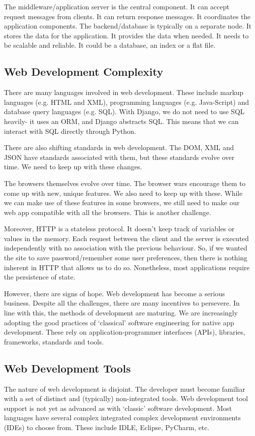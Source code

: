 \documentclass[a4paper, openany]{memoir}
\begin{document}
    The middleware/application server is the central component. It can accept request messages from clients. It can return response messages. It coordinates the application components. The backend/database is typically on a separate node. It stores the data for the application. It provides the data when needed. It needs to be scalable and reliable. It could be a database, an index or a flat file.

    \subsection{Web Development Complexity}
    There are many languages involved in web development. These include markup languages (e.g. HTML and XML), programming languages (e.g. Java-Script) and database query languages (e.g. SQL). With Django, we do not need to use SQL heavily- it uses an ORM, and Django abstracts SQL. This means that we can interact with SQL directly through Python.

    There are also shifting standards in web development. The DOM, XML and JSON have standards associated with them, but these standards evolve over time. We need to keep up with these changes.

    The browsers themselves evolve over time. The browser wars encourage them to come up with new, unique features. We also need to keep up with these. While we can make use of these features in some browsers, we still need to make our web app compatible with all the browsers. This is another challenge.

    Moreover, HTTP is a stateless protocol. It doesn't keep track of variables or values in the memory. Each request between the client and the server is executed independently with no association with the previous behaviour. So, if we wanted the site to save password/remember some user preferences, then there is nothing inherent in HTTP that allows us to do so. Nonetheless, most applications require the persistence of state.

    However, there are signs of hope. Web development has become a serious business. Despite all the challenges, there are many incentives to persevere. In line with this, the methods of development are maturing. We are increasingly adopting the good practices of `classical' software engineering for native app development. These rely on application-programmer interfaces (APIs), libraries, frameworks, standards and tools.

    \subsection{Web Development Tools}
    The nature of web development is disjoint. The developer must become familiar with a set of distinct and (typically) non-integrated tools. Web development tool support is not yet as advanced as with `classic' software development. Most languages have several complex integrated complex development environments (IDEs) to choose from. These include IDLE, Eclipse, PyCharm, etc.
\end{document}
